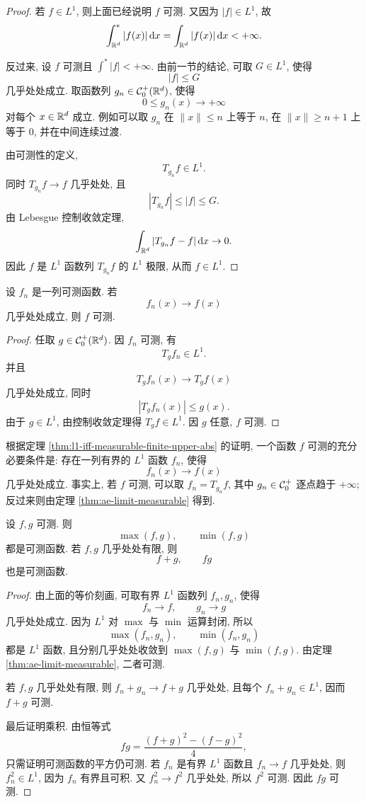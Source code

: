 \begin{proof}
	若 \(f\in L^1\), 则上面已经说明 \(f\) 可测. 又因为 \(|f|\in L^1\), 故
	\[
	\int_{\mathbb{R}^d}^{*}|f(x)|\,\dd x
	=
	\int_{\mathbb{R}^d}|f(x)|\,\dd x<+\infty.
	\]
	
	反过来, 设 \(f\) 可测且 \(\int^*|f|<+\infty\). 由前一节的结论, 可取 \(G\in L^1\), 使得
	\[
	|f|\leq G
	\]
	几乎处处成立. 取函数列 \(g_n\in\mathcal{C}_0^+(\mathbb{R}^d)\), 使得
	\[
	0\leq g_n(x)\to +\infty
	\]
	对每个 \(x\in\mathbb{R}^d\) 成立. 例如可以取 \(g_n\) 在 \(\|x\|\leq n\) 上等于 \(n\), 在 \(\|x\|\geq n+1\) 上等于 \(0\), 并在中间连续过渡.
	
	由可测性的定义,
	\[
	T_{g_n}f\in L^1.
	\]
	同时 \(T_{g_n}f\to f\) 几乎处处, 且
	\[
	|T_{g_n}f|\leq |f|\leq G.
	\]
	由 Lebesgue 控制收敛定理,
	\[
	\int_{\mathbb{R}^d}|T_{g_n}f-f|\,\dd x\to0.
	\]
	因此 \(f\) 是 \(L^1\) 函数列 \(T_{g_n}f\) 的 \(L^1\) 极限, 从而 \(f\in L^1\).
\end{proof}

\begin{thm}\label{thm:ae-limit-measurable}
	设 \(f_n\) 是一列可测函数. 若
	\[
	f_n(x)\to f(x)
	\]
	几乎处处成立, 则 \(f\) 可测.
\end{thm}

\begin{proof}
	任取 \(g\in\mathcal{C}_0^+(\mathbb{R}^d)\). 因 \(f_n\) 可测, 有
	\[
	T_g f_n\in L^1.
	\]
	并且
	\[
	T_g f_n(x)\to T_g f(x)
	\]
	几乎处处成立, 同时
	\[
	|T_g f_n(x)|\leq g(x).
	\]
	由于 \(g\in L^1\), 由控制收敛定理得 \(T_g f\in L^1\). 因 \(g\) 任意, \(f\) 可测.
\end{proof}

根据定理 \ref{thm:l1-iff-measurable-finite-upper-abs} 的证明, 一个函数 \(f\) 可测的充分必要条件是: 存在一列有界的 \(L^1\) 函数 \(f_n\), 使得
\[
f_n(x)\to f(x)
\]
几乎处处成立. 事实上, 若 \(f\) 可测, 可以取 \(f_n=T_{g_n}f\), 其中 \(g_n\in\mathcal{C}_0^+\) 逐点趋于 \(+\infty\); 反过来则由定理 \ref{thm:ae-limit-measurable} 得到.

\begin{thm}\label{thm:measurable-closed-lattice-algebra}
	设 \(f,g\) 可测. 则
	\[
	\max(f,g),
	\qquad
	\min(f,g)
	\]
	都是可测函数. 若 \(f,g\) 几乎处处有限, 则
	\[
	f+g,
	\qquad
	fg
	\]
	也是可测函数.
\end{thm}

\begin{proof}
	由上面的等价刻画, 可取有界 \(L^1\) 函数列 \(f_n,g_n\), 使得
	\[
	f_n\to f,
	\qquad
	g_n\to g
	\]
	几乎处处成立. 因为 \(L^1\) 对 \(\max\) 与 \(\min\) 运算封闭, 所以
	\[
	\max(f_n,g_n),
	\qquad
	\min(f_n,g_n)
	\]
	都是 \(L^1\) 函数, 且分别几乎处处收敛到 \(\max(f,g)\) 与 \(\min(f,g)\). 由定理 \ref{thm:ae-limit-measurable}, 二者可测.
	
	若 \(f,g\) 几乎处处有限, 则 \(f_n+g_n\to f+g\) 几乎处处, 且每个 \(f_n+g_n\in L^1\), 因而 \(f+g\) 可测.
	
	最后证明乘积. 由恒等式
	\[
	fg=\frac{(f+g)^2-(f-g)^2}{4},
	\]
	只需证明可测函数的平方仍可测. 若 \(f_n\) 是有界 \(L^1\) 函数且 \(f_n\to f\) 几乎处处, 则 \(f_n^2\in L^1\), 因为 \(f_n\) 有界且可积. 又 \(f_n^2\to f^2\) 几乎处处, 所以 \(f^2\) 可测. 因此 \(fg\) 可测.
\end{proof}

